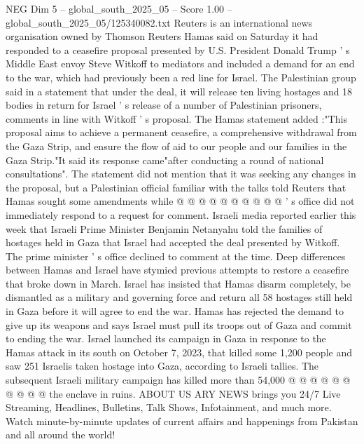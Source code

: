 \begin{textsample}{NEG Dim 5 – global\_south\_2025\_05 – Score 1.00 – global\_south\_2025\_05/125340082.txt}  \label{ex:f5_neg_264}
Reuters is an international news organisation owned by Thomson Reuters Hamas said on Saturday it had responded to a ceasefire proposal presented by U.S.
President Donald Trump ' s Middle East envoy Steve Witkoff to mediators and included a demand for an end to the war, which had previously been a red line for Israel.
The Palestinian group said in a statement that under the deal, it will release ten living hostages and 18 bodies in return for Israel ' s release of a number of Palestinian prisoners, comments in line with Witkoff ' s proposal.
The Hamas statement added :"This proposal aims to achieve a permanent ceasefire, a comprehensive withdrawal from the Gaza Strip, and ensure the flow of aid to our people and our families in the Gaza Strip."It said its response came"after conducting a round of national consultations".
The statement did not mention that it was seeking any changes in the proposal, but a Palestinian official familiar with the talks told Reuters that Hamas sought some amendments while @ @ @ @ @ @ @ @ @ @ ' s office did not immediately respond to a request for comment.
Israeli media reported earlier this week that Israeli Prime Minister Benjamin Netanyahu told the families of hostages held in Gaza that Israel had accepted the deal presented by Witkoff.
The prime minister ' s office declined to comment at the time.
Deep differences between Hamas and Israel have stymied previous attempts to restore a ceasefire that broke down in March.
Israel has insisted that Hamas disarm completely, be dismantled as a military and governing force and return all 58 hostages still held in Gaza before it will agree to end the war.
Hamas has rejected the demand to give up its weapons and says Israel must pull its troops out of Gaza and commit to ending the war.
Israel launched its campaign in Gaza in response to the Hamas attack in its south on October 7, 2023, that killed some 1,200 people and saw 251 Israelis taken hostage into Gaza, according to Israeli tallies.
The subsequent Israeli military campaign has killed more than 54,000 @ @ @ @ @ @ @ @ @ @ the enclave in ruins.
ABOUT US ARY NEWS brings you 24/7 Live Streaming, Headlines, Bulletins, Talk Shows, Infotainment, and much more.
Watch minute-by-minute updates of current affairs and happenings from Pakistan and all around the world!

\end{textsample}
